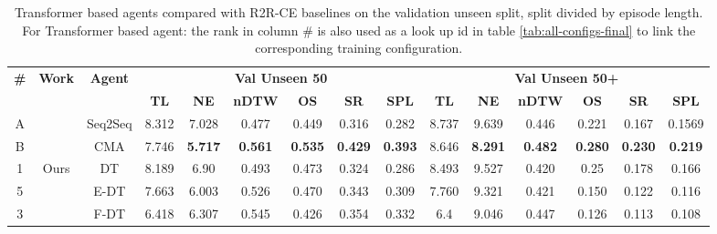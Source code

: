\begin{table}
\centering
\caption{\label{tab:best_unseen_50}Transformer based agents compared with R2R-CE baselines on the validation unseen split, split divided by episode length. For Transformer based agent: the rank in column \# is also used as a look up id in table \ref{tab:all-configs-final} to link the corresponding training configuration.}
\begin{tabular}{@{\hskip3pt}c@{\hskip3pt}c@{\hskip3pt}c@{\hskip3pt}c@{\hskip3pt}c@{\hskip3pt}c@{\hskip3pt}c@{\hskip3pt}c@{\hskip3pt}c@{\hskip3pt}c@{\hskip3pt}c@{\hskip3pt}c@{\hskip3pt}c@{\hskip3pt}c@{\hskip3pt}c}
\toprule
\textbf{\#} & \textbf{Work} & \textbf{Agent} & \multicolumn{6}{c}{\textbf{Val Unseen 50}} & \multicolumn{6}{c}{\textbf{Val Unseen 50+}} \\
 \textbf{~} &     \textbf{~} &                \textbf{~} &       \textbf{TL} &    \textbf{NE} &   \textbf{nDTW} &     \textbf{OS} &    \textbf{SR} &    \textbf{SPL} &         \textbf{TL} &     \textbf{NE} &   \textbf{nDTW} &     \textbf{OS} &    \textbf{SR} &    \textbf{SPL} \\
\midrule
          A &             \citet{VLNCE} &                  Seq2Seq &             8.312 &          7.028 &           0.477 &  0.449 &  0.316 &           0.282 &                8.737 &           9.639 &           0.446 &  0.221 &  0.167 &  0.1569 \\
          B &           &  CMA &             7.746 &          \textbf{5.717} &           \textbf{0.561} &           \textbf{0.535} &          \textbf{0.429} &           \textbf{0.393} &               8.646 &           \textbf{8.291} &           \textbf{0.482} &           \textbf{0.280} &          \textbf{0.230} &           \textbf{0.219} \\
\midrule
          1 &             Ours &                  DT &             8.189 &          6.90 &           0.493 &  0.473 &  0.324 &           0.286 &                8.493 &           9.527 &          0.420 &  0.25 &  0.178 &  0.166 \\
          5 &            &  E-DT &             7.663 &          6.003 &           0.526 &           0.470 &          0.343 &           0.309 &               7.760 &           9.321 &           0.421 &           0.150 &          0.122 &           0.116 \\
          3 &            &  F-DT &              6.418 &  6.307 &  0.545 &           0.426 &          0.354 &  0.332 &                 6.4 &  9.046 &  0.447 &           0.126 &          0.113 &           0.108 \\
\bottomrule
\end{tabular}
\end{table}
